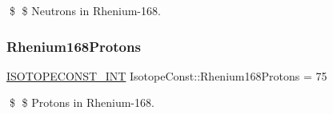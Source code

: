 \$ \$ Neutrons in Rhenium-\/168. \mbox{\label{group___isotope_const-_rhenium-_re168_ga8e38599e8e05475f6e0c363c5b3ef98e}} 
\subsubsection{\texorpdfstring{Rhenium168\+Protons}{Rhenium168Protons}}
{\footnotesize\ttfamily \mbox{\hyperlink{group___isotope_const-_macros_ga5f18360b3e99483a35c32d789e62621c}{I\+S\+O\+T\+O\+P\+E\+C\+O\+N\+S\+T\+\_\+\+I\+NT}} Isotope\+Const\+::\+Rhenium168\+Protons = 75}

\$ \$ Protons in Rhenium-\/168. 
